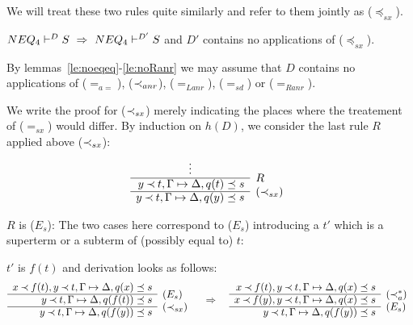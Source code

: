 We will treat these two rules quite similarly and refer to them jointly as ($\preceq_{sx}$).
\begin{LEMMA}\label{le:noInclsx}
 ${NEQ_4}\vdash^{{D}}S\ \mathrel\Rightarrow\ {NEQ_4}\vdash^{{D'}}S$ and $D'$ contains no applications
 of ($\preceq_{sx}$).
\end{LEMMA}
\begin{PROOF}
By lemmas~\ref{le:noeqeq}-\ref{le:noRanr} we may assume that $D$ contains no
applications of ($=_{a=}$), ($\mathbin{\prec}_{anr}$), ($=_{Lanr}$), ($=_{sd}$) or ($=_{Ranr}$).

We write the proof for ($\mathbin{\prec}_{sx}$) merely indicating the places where the
treatement of ($=_{sx}$) would differ.
By induction on $h(D)$, we consider the last rule $R$ applied above
($\mathbin{\prec}_{sx}$):
\[ \begin{array}{rl}
\multicolumn{1}{c}{\vdots} \\ \cline{1-1}
y\Incl t, \GSD, q(t)\preceq s & \rabove{R}\\ \cline{1-1}
y\Incl t, \GSD, q(y)\preceq s & \rabove{(\Incl_{sx})}
\end{array} \]
\begin{LS}
\item $R$ is ($E_s$):
The two cases here correspond to ($E_s$) introducing a $t'$ which is a superterm or a
subterm of (possibly equal to) $t$:
 \begin{LSA}
 \item $t'$ is $f(t)$ and derivation looks as follows:
\[ \begin{array}{rl}
  x\Incl f(t), y\Incl t, \GSD, q(x)\preceq s \\ \cline{1-1}
               y\Incl t, \GSD, q(f(t))\preceq s & \rabove{(E_s)} \\ \cline{1-1}
               y\Incl t, \GSD, q(f(y))\preceq s & \rabove{(\Incl_{sx})} 
\end{array} 
\conv
\begin{array}{rl}
  x\Incl f(t), y\Incl t, \GSD, q(x)\preceq s \\ \cline{1-1}
  x\Incl f(y), y\Incl t, \GSD, q(x)\preceq s & \rabove{(\Incl_a^*)} \\ \cline{1-1}
               y\Incl t, \GSD, q(f(y))\preceq s & \rabove{(E_s)} 
\end{array}
\]

\end{LSA}
\end{LS}
\end{PROOF}
